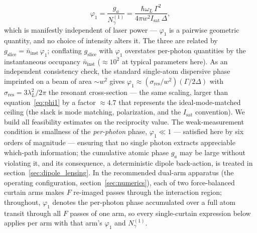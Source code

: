 \documentclass[11pt,a4paper]{article}
\begin{document}
\begin{equation}
\varphi_1 = \frac{g_a}{N_\gamma^{(1)}} = \frac{\hbar\omega_L\,\Gamma^2}{4\pi w^2 I_\text{sat}\,\Delta},
\label{eq:phi1}
\end{equation}
which is manifestly independent of laser power --- $\varphi_1$ is a pairwise geometric quantity, and no choice of intensity alters it. The three are related by $g_\text{slice} = \bar{n}_\text{inst}\,\varphi_1$; conflating $g_\text{slice}$ with $\varphi_1$ overstates per-photon quantities by the instantaneous occupancy $\bar{n}_\text{inst}$ ($\approx 10^2$ at typical parameters here). As an independent consistency check, the standard single-atom dispersive phase imprinted on a beam of area $\sim w^2$ gives $\varphi_1 \approx (\sigma_\text{res}/w^2)(\Gamma/2\Delta)$ with $\sigma_\text{res} = 3\lambda_L^2/2\pi$ the resonant cross-section --- the same scaling, larger than equation~\eqref{eq:phi1} by a factor $\approx 4.7$ that represents the ideal-mode-matched ceiling (the slack is mode matching, polarization, and the $I_\text{sat}$ convention). We build all feasibility estimates on the reciprocity value. The weak-measurement condition is smallness of the \emph{per-photon} phase, $\varphi_1 \ll 1$ --- satisfied here by six orders of magnitude --- ensuring that no single photon extracts appreciable which-path information; the cumulative atomic phase $g_a$ may be large without violating it, and its consequence, a deterministic dipole back-action, is treated in section~\ref{sec:dipole_lensing}. In the recommended dual-arm apparatus (the operating configuration, section~\ref{sec:numerics}), each of two force-balanced curtain arms makes $F$ re-imaged passes through the interaction region; throughout, $\varphi_1$ denotes the per-photon phase accumulated over a full atom transit through all $F$ passes of one arm, so every single-curtain expression below applies per arm with that arm's $\varphi_1$ and $N_\gamma^{(1)}$.
\end{document}
